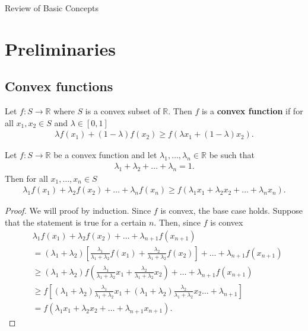 \documentclass{memoir}
\begin{document}
\pagestyle{empty}
\begingroup
    {\hfill \HUGE Review of Basic Concepts}
\endgroup

\tableofcontents

\chapter{Preliminaries}
\section{Convex functions}
\begin{definition}
    Let $f:S\to \mathbb{R}$ where $S$ is a convex subset of $\mathbb{R}$. Then $f$ is a \textbf{convex function} if for all $x_1,x_2 \in S$ and $\lambda \in [0,1]$
    \begin{align*}
        \lambda f(x_1) + (1- \lambda)f(x_2) \ge f( \lambda x_1 + (1- \lambda) x_2).
    \end{align*}
\end{definition}

\begin{theorem}
    Let $f:S \to \mathbb{R}$ be a convex function and let $\lambda_1,\ldots,\lambda_n \in \mathbb{R}$ be such that
    \begin{align*}
        \lambda_1 + \lambda_2 + \ldots + \lambda_n = 1.
    \end{align*}
    Then for all $x_1,\ldots,x_n \in S$
    \begin{align*}
        \lambda_1 f(x_1) + \lambda_2 f(x_2) + \ldots + \lambda_n f(x_n) \ge f(\lambda_1 x_1 + \lambda_2 x_2 + \ldots + \lambda_n x_n).
    \end{align*}
\end{theorem}
\begin{proof}
    We will proof by induction. Since $f$ is convex, the base case holds. Suppose that the statement is true for a certain $n$. Then, since $f$ is convex
    \begin{align*}
        &\lambda_1 f(x_1) + \lambda_2 f(x_2) + \ldots + \lambda_{n+1} f(x_{n+1}) \\
        &= (\lambda_1+\lambda_2)\left[\frac{\lambda_1}{\lambda_1 + \lambda_2} f(x_1) + \frac{\lambda_2}{\lambda_1+\lambda_2}f(x_2)\right] + \ldots + \lambda_{n+1} f(x_{n+1})  \\
        &\ge (\lambda_1 + \lambda_2)f\left( \frac{\lambda_1}{\lambda_1 + \lambda_2} x_1 + \frac{\lambda_2}{\lambda_1+\lambda_2}x_2\right) + \ldots + \lambda_{n+1} f(x_{n+1}) \\
        &\ge f\left[(\lambda_1 + \lambda_2) \frac{\lambda_1}{\lambda_1 + \lambda_2} x_1 + (\lambda_1 + \lambda_2)\frac{\lambda_2}{\lambda_1+\lambda_2}x_2\ldots + \lambda_{n+1}\right] \\
        &= f(\lambda_1 x_1 + \lambda_2 x_2 + \ldots + \lambda_{n+1} x_{n+1}).
    \end{align*}
\end{proof}
\end{document}
